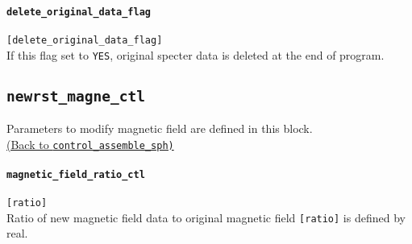 \paragraph{\tt delete\_original\_data\_flag}
\label{href_t:delete_original_data_flag}
\verb|[delete_original_data_flag]| \\
If this flag set to \verb|YES|, original specter data is deleted at the end of program. 

\subsection{\tt newrst\_magne\_ctl}
\label{href_t:newrst_magne_ctl}
Parameters to modify magnetic field are defined in this block. \\
\hyperref[href_i:newrst_magne_ctl]{(Back to {\tt control\_assemble\_sph)}}

\paragraph{\tt magnetic\_field\_ratio\_ctl}
\label{href_t:magnetic_field_ratio_ctl} 
\verb|[ratio]| \\
Ratio of new magnetic field data to original magnetic field \verb|[ratio]| is defined by real.
